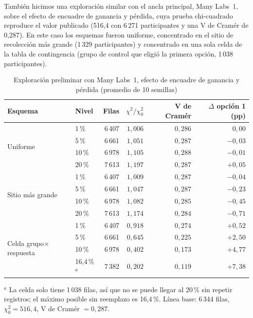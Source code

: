\documentclass[11pt,openany,oneside,letterpaper]{book}
\begin{document}
También hicimos una exploración similar con el ancla principal, Many Labs~1, sobre el efecto de encuadre de ganancia y pérdida, cuya prueba chi-cuadrado reproduce el valor publicado (516,4 con 6\,271 participantes y una V de Cramér de 0,287). En este caso los esquemas fueron uniforme, concentrado en el sitio de recolección más grande (1\,329 participantes) y concentrado en una sola celda de la tabla de contingencia (grupo de control que eligió la primera opción, 1\,038 participantes).

\begin{table}[!htbp]
\centering
\caption{Exploración preliminar con Many Labs~1, efecto de encuadre de ganancia y pérdida (promedio de 10 semillas)}
\label{tab:prelim_ml}
\small
\begin{tabular}{llrrrr}
\toprule
\textbf{Esquema} & \textbf{Nivel} & \textbf{Filas} & \textbf{$\chi^2/\chi^2_0$} & \textbf{V de Cramér} & \textbf{$\Delta$ opción 1 (pp)} \\
\midrule
 \multirow{4}{*}{Uniforme} & 1\,\% & 6\,407 & $1{,}006$ & $0{,}286$ & $0{,}00$ \\
  & 5\,\% & 6\,661 & $1{,}051$ & $0{,}287$ & $-0{,}03$ \\
  & 10\,\% & 6\,978 & $1{,}105$ & $0{,}288$ & $-0{,}01$ \\
  & 20\,\% & 7\,613 & $1{,}197$ & $0{,}287$ & $+0{,}05$ \\
 \midrule
 \multirow{4}{*}{Sitio más grande} & 1\,\% & 6\,407 & $1{,}009$ & $0{,}287$ & $-0{,}04$ \\
  & 5\,\% & 6\,661 & $1{,}047$ & $0{,}287$ & $-0{,}23$ \\
  & 10\,\% & 6\,978 & $1{,}082$ & $0{,}285$ & $-0{,}45$ \\
  & 20\,\% & 7\,613 & $1{,}174$ & $0{,}284$ & $-0{,}71$ \\
 \midrule
 \multirow{4}{*}{Celda grupo$\times$respuesta} & 1\,\% & 6\,407 & $0{,}918$ & $0{,}274$ & $+0{,}52$ \\
  & 5\,\% & 6\,661 & $0{,}645$ & $0{,}225$ & $+2{,}50$ \\
  & 10\,\% & 6\,978 & $0{,}402$ & $0{,}173$ & $+4{,}77$ \\
  & 16,4\,\%$^{a}$ & 7\,382 & $0{,}202$ & $0{,}119$ & $+7{,}38$ \\
 \bottomrule
\end{tabular}

\vspace{2pt}
{\footnotesize $^{a}$ La celda solo tiene 1\,038 filas, así que no se puede llegar al 20\,\% sin repetir registros; el máximo posible sin reemplazo es 16,4\,\%. Línea base: 6\,344 filas, $\chi^2_0 = 516{,}4$, V de Cramér $= 0{,}287$.}
\end{table}
\end{document}
